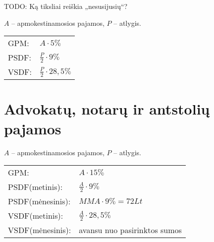 TODO: Ką tiksliai reiškia „nesusijusių“?

$A$ – apmokestinamosios pajamos, $P$ – atlygis.

\begin{tabularx}{15cm}{p{7.5cm}|p{7.5cm}}
  GPM: & $A \cdot 5\%$ \\
  PSDF: & $\frac{P}{2} \cdot 9\%$ \\
  VSDF: & $\frac{P}{2} \cdot 28,5\%$ \\
\end{tabularx}

\section{Advokatų, notarų ir antstolių pajamos}

$A$ – apmokestinamosios pajamos, $P$ – atlygis.

\begin{tabularx}{15cm}{p{7.5cm}|p{7.5cm}}
  GPM: & $A \cdot 15\%$ \\
  PSDF(metinis): & $\frac{A}{2} \cdot 9\%$ \\
  PSDF(mėnesinis): & $MMA \cdot 9\% = 72 Lt$ \\
  VSDF(metinis): & $\frac{A}{2} \cdot 28,5\%$ \\
  VSDF(mėnesinis): & avansu nuo pasirinktos sumos \\
\end{tabularx}
